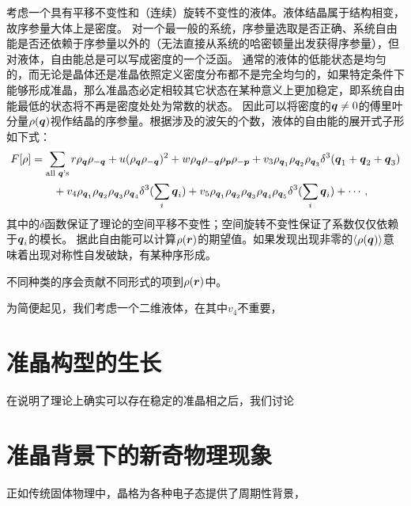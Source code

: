 \documentclass[hyperref, UTF8, a4paper]{ctexart}
\begin{document}
考虑一个具有平移不变性和（连续）旋转不变性的液体。液体结晶属于结构相变，故序参量大体上是密度。
对一个最一般的系统，序参量选取是否正确、系统自由能是否还依赖于序参量以外的（无法直接从系统的哈密顿量出发获得序参量），但对液体，自由能总是可以写成密度的一个泛函\cite{Evans_2016,cdft2020}。
通常的液体的低能状态是均匀的，而无论是晶体还是准晶依照定义密度分布都不是完全均匀的，如果特定条件下能够形成准晶，那么准晶态必定相较其它状态在某种意义上更加稳定，即系统自由能最低的状态将不再是密度处处为常数的状态。
因此可以将密度的$\vb*{q} \neq 0$的傅里叶分量$\rho(\vb*{q})$视作结晶的序参量。根据涉及的波矢的个数，液体的自由能的展开式子形如下式：
\begin{equation}
    \begin{aligned}
        F[\rho] &= \sum_\text{all $\vb*{q}$'s} r \rho_{\vb*{q}} \rho_{- \vb*{q}} + u (\rho_{\vb*{q}} \rho_{- \vb*{q}})^2 
        + w \rho_{\vb*{q}} \rho_{- \vb*{q}} \rho_{\vb*{p}} \rho_{- \vb*{p}} 
        + v_3 \rho_{\vb*{q}_1} \rho_{\vb*{q}_2} \rho_{\vb*{q}_3} \delta^3(\vb*{q}_1 + \vb*{q}_2 + \vb*{q}_3) \\
        &\quad \quad + v_4 \rho_{\vb*{q}_1} \rho_{\vb*{q}_2} \rho_{\vb*{q}_3} \rho_{\vb*{q}_4} \delta^3(\sum_i \vb*{q}_i) 
        + v_5 \rho_{\vb*{q}_1} \rho_{\vb*{q}_2} \rho_{\vb*{q}_3} \rho_{\vb*{q}_4} \rho_{\vb*{q}_5}
        \delta^3(\sum_i \vb*{q}_i) + \cdots,
    \end{aligned}
\end{equation}
其中的$\delta$函数保证了理论的空间平移不变性；空间旋转不变性保证了系数仅仅依赖于$\vb*{q}_i$的模长。
据此自由能可以计算$\rho(\vb*{r})$的期望值。如果发现出现非零的$\expval{\rho(\vb*{q})}$意味着出现对称性自发破缺，有某种序形成。

不同种类的序会贡献不同形式的项到$\rho(\vb*{r})$中。

为简便起见，我们考虑一个二维液体，在其中$v_4$不重要，

\section{准晶构型的生长}

在说明了理论上确实可以存在稳定的准晶相之后，我们讨论

\section{准晶背景下的新奇物理现象}

正如传统固体物理中，晶格为各种电子态提供了周期性背景，


 
\end{document}

